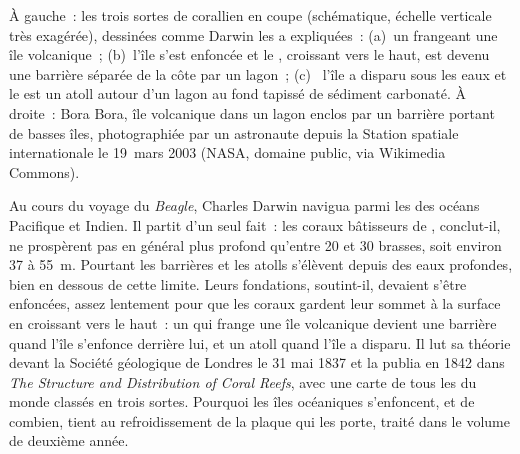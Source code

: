 \begin{omfigure}
{\small À gauche~: les trois sortes de  corallien en coupe (schématique,
échelle verticale très exagérée), dessinées comme Darwin les a expliquées~: (a)~un 
frangeant une île volcanique~; (b)~l'île s'est enfoncée et le , croissant
vers le haut, est devenu une barrière séparée de la côte par un lagon~; (c)~
l'île a disparu sous les eaux et le  est un atoll autour d'un lagon au fond tapissé
de sédiment carbonaté. À droite~: Bora Bora, île volcanique dans un lagon
enclos par un  barrière portant de basses îles, photographiée par un astronaute
depuis la Station spatiale internationale le 19~mars 2003 (NASA, domaine public,
via Wikimedia Commons).}
\label{fig:b1:chemical-biogenic-sediments:reefs}
\end{omfigure}

\begin{history}
Au cours du voyage du \emph{Beagle}, Charles Darwin navigua parmi
les  des océans Pacifique et Indien. Il partit d'un seul fait~: les coraux bâtisseurs de , conclut-il, ne
prospèrent pas en général plus profond qu'entre 20 et 30 brasses, soit environ 37 à \qty{55}{m}.
Pourtant les  barrières et les atolls s'élèvent depuis des eaux profondes, bien en dessous de cette limite. Leurs
fondations, soutint-il, devaient s'être enfoncées, assez lentement pour que les coraux gardent
leur sommet à la surface en croissant vers le haut~: un  qui frange une île
volcanique devient une barrière quand l'île s'enfonce derrière lui, et un atoll quand
l'île a disparu. Il lut sa théorie devant la Société géologique de
Londres le 31 mai 1837 et la publia en 1842 dans \emph{The Structure and
Distribution of Coral Reefs}, avec une carte de tous les  du monde classés
en trois sortes. Pourquoi les îles océaniques s'enfoncent, et de combien, tient au
refroidissement de la plaque qui les porte, traité dans le volume de deuxième année.
\end{history}

